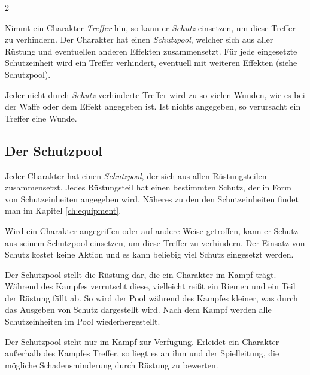 \begin{multicols}{2}
\begin{pexample}[Beispiel]
Nimmt ein Charakter \textit{Treffer} hin, so kann er \textit{Schutz} einsetzen, um diese Treffer zu verhindern. Der Charakter hat einen \textit{Schutzpool}, welcher sich aus aller Rüstung und eventuellen anderen Effekten zusammensetzt. Für jede eingesetzte Schutzeinheit wird ein Treffer verhindert, eventuell mit weiteren Effekten (siehe Schutzpool).

Jeder nicht durch \textit{Schutz} verhinderte Treffer wird zu so vielen Wunden, wie es bei der Waffe oder dem Effekt angegeben ist. Ist nichts angegeben, so verursacht ein Treffer eine Wunde.

\subsection{Der Schutzpool}

Jeder Charakter hat einen \textit{Schutzpool}, der sich aus allen Rüstungsteilen zusammensetzt. Jedes Rüstungsteil hat einen bestimmten Schutz, der in Form von Schutzeinheiten angegeben wird. Näheres zu den den Schutzeinheiten findet man im Kapitel \cref{ch:equipment}.

Wird ein Charakter angegriffen oder auf andere Weise getroffen, kann er Schutz aus seinem Schutzpool einsetzen, um diese Treffer zu verhindern. Der Einsatz von Schutz kostet keine Aktion und es kann beliebig viel Schutz eingesetzt werden.

Der Schutzpool stellt die Rüstung dar, die ein Charakter im Kampf trägt. Während des Kampfes verrutscht diese, vielleicht reißt ein Riemen und ein Teil der Rüstung fällt ab. So wird der Pool während des Kampfes kleiner, was durch das Ausgeben von Schutz dargestellt wird. Nach dem Kampf werden alle Schutzeinheiten im Pool wiederhergestellt.

Der Schutzpool steht nur im Kampf zur Verfügung. Erleidet ein Charakter außerhalb des Kampfes Treffer, so liegt es an ihm und der Spielleitung, die mögliche Schadensminderung durch Rüstung zu bewerten.

\end{pexample}
\end{multicols}
